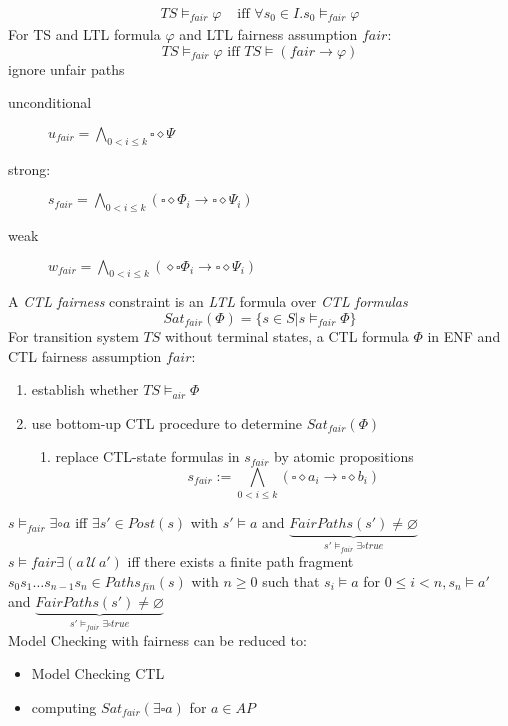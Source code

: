 \documentclass[a4paper, 10pt]{article}
\newcommand{\until}{\,\mathcal{U}\,}
\begin{document}
\begin{mdframed}
\begin{align*}
TS\models_{fair}\varphi &\text{ iff }\forall s_0\in I.s_0\models_{fair}\varphi
\end{align*}
For TS and LTL formula $\varphi$ and LTL fairness assumption $fair$:
\[ TS\models_{fair}\varphi \text{ iff } TS\models(fair\to\varphi) \]
\follows ignore unfair paths
\begin{description}
    \item[unconditional] $u_{fair} = \bigwedge_{0<i\leq k}\square\diamond\Psi$
    \item[strong:] $s_{fair} = \bigwedge_{0<i\leq k}(\square\diamond\Phi_i\to\square\diamond\Psi_i)$
    \item[weak] $w_{fair} = \bigwedge_{0<i\leq k}(\diamond\square\Phi_i\to\square\diamond\Psi_i)$
\end{description}
A \emph{CTL fairness} constraint is an \emph{LTL} formula over \emph{CTL formulas}
\[ Sat_{fair}(\Phi) = \{s\in S| s\models_{fair} \Phi\} \]
For transition system $TS$ without terminal states, a CTL formula $\Phi$ in ENF and CTL fairness assumption $fair$:
\begin{enumerate}
    \item establish whether $TS\models_{air}\Phi$
    \item use bottom-up CTL procedure to determine $Sat_{fair}(\Phi)$
    \begin{enumerate}
        \item replace CTL-state formulas in $s_{fair}$ by atomic propositions \[ s_{fair}:=\bigwedge_{0<i\leq k}(\square\diamond a_i \to \square\diamond b_i) \]
    \end{enumerate}
\end{enumerate}
$s\models_{fair}\exists\circ a$ iff $\exists s'\in Post(s)$ with $s'\models a$ and $\underset{s'\models_{fair}\exists\square true}{\underbrace{FairPaths(s')\not=\varnothing}}$
\\
$s\models{fair}\exists(a\until a')$ iff there exists a finite path fragment $s_0s_1\dots s_{n-1}s_n\in Paths_{fin}(s)$ with $n\geq 0$ such that $s_i\models a$ for $0\leq i<n,s_n\models a'$ and $\underset{s'\models_{fair}\exists\square true}{\underbrace{FairPaths(s')\not=\varnothing}}$
\\
Model Checking with fairness can be reduced to:
\begin{itemize}
    \item Model Checking CTL
    \item computing $Sat_{fair}(\exists\square a)$ for $a\in AP$
\end{itemize}


\end{mdframed}
\end{document}
